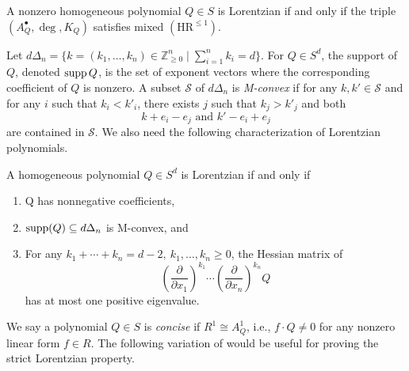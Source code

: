 \begin{theorem}\label{thm: lorentzian and HR}
A nonzero homogeneous polynomial $Q\in S$  is Lorentzian if and only if the triple $(A^\bullet_Q,\deg,K_Q)$ satisfies mixed $(\mathrm{HR}^{\leq 1})$.
\end{theorem}

Let $d\Delta_n=\{k=(k_1,\ldots,k_n)\in \mathbb Z_{\geq 0}^n\mid \sum_{i=1}^n k_i=d\}$. For $Q\in S^d$, the support of $Q$, denoted $\operatorname{supp} Q$, is the set of exponent vectors where the corresponding coefficient of $Q$ is nonzero. A subset $\mathcal S$ of $d\Delta_n$ is \textit{M-convex} if for any $k,k'\in \mathcal S$ and for any $i$ such that $k_i<k'_i$, there exists $j$ such that $k_j>k'_j$ and both
\[
    k+e_i-e_j\text{ and } k'-e_i+e_j
\]
are contained in $\mathcal S$. We also need the following characterization of Lorentzian polynomials.

\begin{theorem}[{\cite[Theorem 2.25]{BH20}}]\label{thm: Lorentzian-criterion}
A homogeneous polynomial $Q\in S^d$ is Lorentzian if and only if
\begin{enumerate}
    \item  Q has nonnegative coefficients,
    \item $\operatorname{supp}(Q)\subseteq d\Delta_n$ is M-convex, and
    \item For any $k_1+\cdots +k_n=d-2,\ k_1,\ldots,k_n\geq 0$, the Hessian matrix of \[\left(\frac{\partial}{\partial x_1}\right)^{k_1}\cdots\left(\frac{\partial}{\partial x_n}\right)^{k_n}Q \] has at most one positive eigenvalue.
\end{enumerate}
\end{theorem}

We say a polynomial $Q\in S$ is \textit{concise} if $R^1\cong A^1_Q$, i.e., $f\cdot Q\neq 0$ for any nonzero linear form $f\in R$. The following variation of \cite[Theorem 2.10]{BH20} would be useful for proving the strict Lorentzian property.

